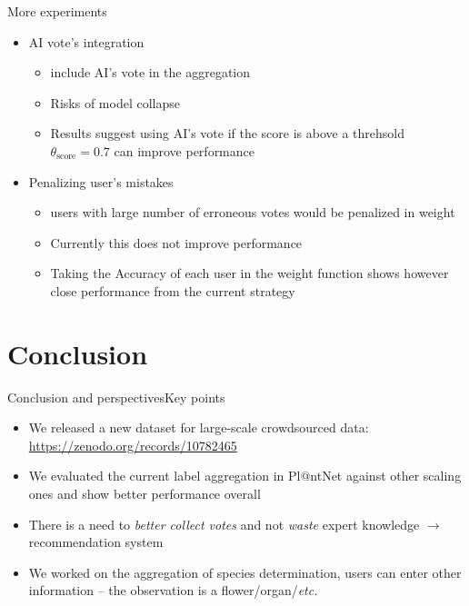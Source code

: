 \begin{frame}{More experiments}{}
\begin{itemize}
    \item AI vote's integration
    \begin{itemize}
        \item<2-> include AI's vote in the aggregation
        \item<2-> Risks of model collapse
        \item<2-> Results suggest using AI's vote if the score is above a threhsold $\theta_{\text{score}}=0.7$ can improve performance
    \end{itemize}
    \item Penalizing user's mistakes
    \begin{itemize}
        \item<3-> users with large number of erroneous votes would be penalized in weight
        \item<3-> Currently this does not improve performance
        \item<3-> Taking the Accuracy of each user in the weight function shows however close performance from the current strategy
    \end{itemize}
\end{itemize}
\end{frame}


\section{Conclusion}

\begin{frame}{Conclusion and perspectives}{Key points}
    \begin{itemize}
        \item We released a new dataset for large-scale crowdsourced data: \url{https://zenodo.org/records/10782465}
        \item We evaluated the current label aggregation in Pl@ntNet against other scaling ones and show better performance overall
    \end{itemize}
    \pause
    \vspace{1.5cm}
    \begin{itemize}
        \item There is a need to \emph{better collect votes} and not \emph{waste} expert knowledge $\rightarrow$ recommendation system
        \item We worked on the aggregation of species determination, users can enter other information -- the observation is a flower/organ/\emph{etc.}
    \end{itemize}
\end{frame}

